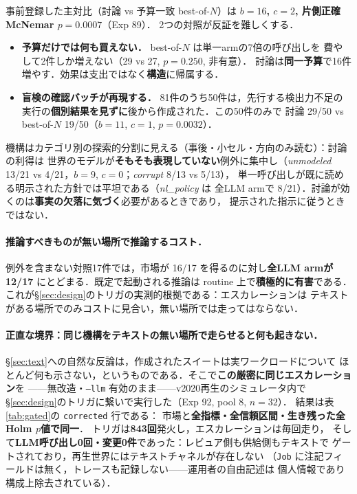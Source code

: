 \documentclass[uplatex,twocolumn,fontsize=9pt,paper=a4]{jlreq}
\begin{document}
事前登録した主対比（討論 vs 予算一致 best-of-$N$）は
\textbf{$b=16$, $c=2$, 片側正確McNemar $p=0.0007$}（Exp 89）．
2つの対照が反証を難しくする．
\begin{itemize}
  \item \textbf{予算だけでは何も買えない．} best-of-$N$ は単一armの7倍の呼び出しを
        費やして2件しか増えない（29 vs 27, $p=0.250$, 非有意）．
        討論は\textbf{同一予算}で16件増やす．効果は支出ではなく\textbf{構造}に帰属する．
  \item \textbf{盲検の確認バッチが再現する．} 81件のうち50件は，先行する検出力不足の
        実行の\textbf{個別結果を見ずに}後から作成された．この50件のみで
        討論 29/50 vs best-of-$N$ 19/50（$b=11$, $c=1$, $p=0.0032$）．
\end{itemize}

機構はカテゴリ別の探索的分割に見える（事後・小セル・方向のみ読む）：討論の利得は
世界のモデルが\textbf{そもそも表現していない}例外に集中し（\textit{unmodeled}
13/21 vs 4/21，$b=9$, $c=0$；\textit{corrupt} 8/13 vs 5/13），
単一呼び出しが既に読める明示された方針では平坦である（\textit{nl\_policy} は
全LLM armで 8/21）．討論が効くのは\textbf{事実の欠落に気づく}必要があるときであり，
提示された指示に従うときではない．

\paragraph{推論すべきものが無い場所で推論するコスト．}
例外を含まない対照17件では，市場が 16/17 を得るのに対し\textbf{全LLM armが 12/17}
にとどまる．既定で起動される推論は routine 上で\textbf{積極的に有害}である．
これが\S\ref{sec:design}のトリガの実測的根拠である：エスカレーションは
テキストがある場所でのみコストに見合い，無い場所では走ってはならない．

\paragraph{正直な境界：同じ機構をテキストの無い場所で走らせると何も起きない．}
\S\ref{sec:text}への自然な反論は，作成されたスイートは実ワークロードについて
ほとんど何も示さない，というものである．そこで\textbf{この厳密に同じエスカレーション}を
——無改造・\texttt{--llm} 有効のまま——v2020再生のシミュレータ内で
\S\ref{sec:design}のトリガに繋いで実行した（Exp 92, pool 8, $n=32$）．
結果は表\ref{tab:gated}の \texttt{corrected} 行である：
市場と\textbf{全指標・全信頼区間・生き残った全Holm $p$値で同一}．
トリガは\textbf{843回}発火し，エスカレーションは毎回走り，
そして\textbf{LLM呼び出し0回・変更0件}であった：レビュア側も供給側もテキストで
ゲートされており，再生世界にはテキストチャネルが存在しない
（\texttt{Job} に注記フィールドは無く，トレースも記録しない——運用者の自由記述は
個人情報であり構成上除去されている）．
\end{document}
